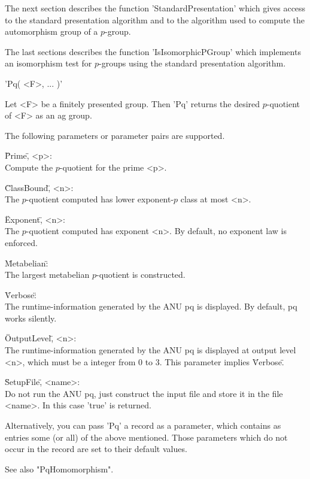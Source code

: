 The  next  section describes  the  function 'StandardPresentation'  which
gives access to the standard presentation algorithm and to the  algorithm
used to compute the automorphism group of a $p$-group.

The  last sections  describes  the  function  'IsIsomorphicPGroup'  which
implements  an  isomorphism  test  for  $p$-groups  using  the   standard
presentation algorithm.


'Pq( <F>, ... )'

Let <F> be a  finitely presented  group.  Then  'Pq' returns  the desired
$p$-quotient of <F> as an ag group.

The following parameters or parameter pairs are supported.

\"Prime\", <p>: \\
    Compute the $p$-quotient for the prime <p>.

\"ClassBound\", <n>: \\
    The $p$-quotient computed has lower exponent-$p$ class at most <n>.

\"Exponent\", <n>: \\
    The $p$-quotient computed has exponent <n>.
    By default, no exponent law is enforced.

\"Metabelian\": \\
    The largest metabelian $p$-quotient is constructed.

\"Verbose\": \\
    The runtime-information generated  by  the ANU  pq is  displayed.  By
    default, pq works silently.

\"OutputLevel\", <n>: \\
    The runtime-information  generated by the  ANU  pq  is  displayed  at
    output  level  <n>,  which  must  be a  integer from  0 to  3.   This
    parameter implies \"Verbose\".

\"SetupFile\", <name>: \\
    Do not run the ANU pq, just  construct the input file and store it in
    the file <name>. In this case 'true' is returned.

Alternatively, you can pass 'Pq' a record as a parameter, which  contains
as entries some (or all)  of the above mentioned.  Those parameters which
do not occur in the record are set to their default values.

See also "PqHomomorphism".

